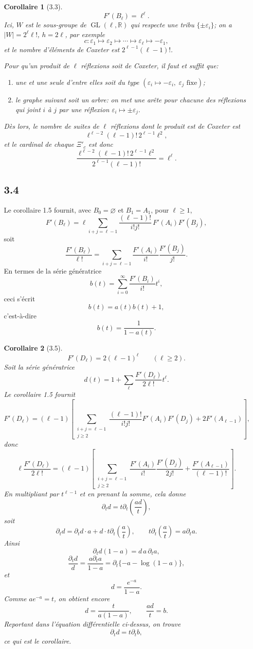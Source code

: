 \documentclass[11pt]{article}
\newcommand{\GL}{\operatorname{GL}}
\theoremstyle{plainfr}
\newtheorem*{corollaire}{Corollaire}
\begin{document}
\begin{corollaire}[3.3]
\[
 F'(B_\ell)=\ell^\ell.
\]
Ici, $W$ est le sous-groupe de $\GL(\ell,\mathbb R)$ qui respecte une tribu $\{\pm\varepsilon_i\}$; on a $|W|=2^\ell\ell!$, $h=2\ell$, par exemple
\[
 c:\varepsilon_1\mapsto\varepsilon_2\mapsto\cdots\mapsto\varepsilon_\ell\mapsto-\varepsilon_1,
\]
et le nombre d'éléments de Coxeter est $2^{\ell-1}(\ell-1)!$.

Pour qu'un produit de $\ell$ réflexions soit de Coxeter, il faut et suffit que:
\begin{enumerate}[label=(\alph*),leftmargin=2.2em]
\item une et une seule d'entre elles soit du type $(\varepsilon_i\mapsto-\varepsilon_i,\;\varepsilon_j\text{ fixe})$;
\item le graphe suivant soit un arbre: on met une arête pour chacune des réflexions qui joint $i$ à $j$ par une réflexion $\varepsilon_i\mapsto\pm\varepsilon_j$.
\end{enumerate}
Dès lors, le nombre de suites de $\ell$ réflexions dont le produit est de Coxeter est
\[
 \ell^{\ell-2}(\ell-1)!\,2^{\ell-1}\ell^2,
\]
et le cardinal de chaque $\Xi'_c$ est donc
\[
 \frac{\ell^{\ell-2}(\ell-1)!\,2^{\ell-1}\ell^2}{2^{\ell-1}(\ell-1)!}=\ell^\ell.
\]
\end{corollaire}

\subsection*{3.4}
Le corollaire 1.5 fournit, avec $B_0=\varnothing$ et $B_1=A_1$, pour $\ell\ge1$,
\[
 F'(B_\ell)=\ell\sum_{i+j=\ell-1}\frac{(\ell-1)!}{i!j!}\,F'(A_i)F'(B_j),
\]
soit
\[
 \frac{F'(B_\ell)}{\ell!}=\sum_{i+j=\ell-1}\frac{F'(A_i)}{i!}\frac{F'(B_j)}{j!}.
\]
En termes de la série génératrice
\[
 b(t)=\sum_{i=0}^\infty\frac{F'(B_i)}{i!}t^i,
\]
ceci s'écrit
\[
 b(t)=a(t)b(t)+1,
\]
c'est-à-dire
\[
 b(t)=\frac1{1-a(t)}.
\]

\begin{corollaire}[3.5]
\[
 F'(D_\ell)=2(\ell-1)^\ell\qquad (\ell\ge2).
\]
Soit la série génératrice
\[
 d(t)=1+\sum_\ell\frac{F'(D_\ell)}{2\ell!}t^\ell.
\]
Le corollaire 1.5 fournit
\[
F'(D_\ell)=(\ell-1)\left[
\sum_{\substack{i+j=\ell-1\\ j\ge2}}
\frac{(\ell-1)!}{i!j!}F'(A_i)F'(D_j)+2F'(A_{\ell-1})\right],
\]
donc
\[
\ell\frac{F'(D_\ell)}{2\ell!}=(\ell-1)\left[
\sum_{\substack{i+j=\ell-1\\ j\ge2}}
\frac{F'(A_i)}{i!}\frac{F'(D_j)}{2j!}
+\frac{F'(A_{\ell-1})}{(\ell-1)!}\right].
\]
En multipliant par $t^{\ell-1}$ et en prenant la somme, cela donne
\[
 \partial_t d=t\partial_t\left(\frac{ad}{t}\right),
\]
soit
\[
\partial_t d=\partial_t d\cdot a+d\cdot t\partial_t\left(\frac{a}{t}\right),\qquad
 t\partial_t\left(\frac{a}{t}\right)=a\partial_t a.
\]
Ainsi
\[
 \partial_t d(1-a)=d\,a\,\partial_t a,
\]
\[
 \frac{\partial_t d}{d}=\frac{a\partial_t a}{1-a}=\partial_t\{-a-\log(1-a)\},
\]
et
\[
 d=\frac{e^{-a}}{1-a}.
\]
Comme $ae^{-a}=t$, on obtient encore
\[
 d=\frac{t}{a(1-a)},\qquad \frac{ad}{t}=b.
\]
Reportant dans l'équation différentielle ci-dessus, on trouve
\[
 \partial_t d=t\partial_t b,
\]
ce qui est le corollaire.
\end{corollaire}
\end{document}
